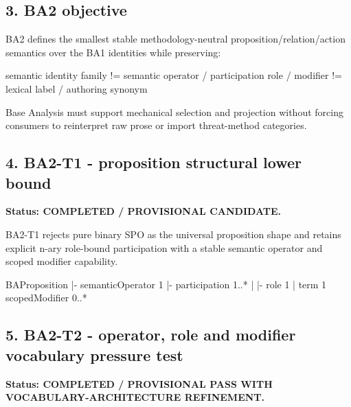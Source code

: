 \documentclass[
  10pt,
  letterpaper,
]{article}
\newenvironment{Shaded}{}{}
\newcommand{\NormalTok}[1]{#1}
\begin{document}
\subsection{3. BA2 objective}\label{ba2-objective}

BA2 defines the smallest stable methodology-neutral
proposition/relation/action semantics over the BA1 identities while
preserving:

\begin{Shaded}
\begin{Highlighting}[]
\NormalTok{semantic identity family}
\NormalTok{    !=}
\NormalTok{semantic operator / participation role / modifier}
\NormalTok{    !=}
\NormalTok{lexical label / authoring synonym}
\end{Highlighting}
\end{Shaded}

Base Analysis must support mechanical selection and projection without
forcing consumers to reinterpret raw prose or import threat-method
categories.

\subsection{4. BA2-T1 - proposition structural lower
bound}\label{ba2-t1---proposition-structural-lower-bound}

\textbf{Status: COMPLETED / PROVISIONAL CANDIDATE.}

BA2-T1 rejects pure binary SPO as the universal proposition shape and
retains explicit n-ary role-bound participation with a stable semantic
operator and scoped modifier capability.

\begin{Shaded}
\begin{Highlighting}[]
\NormalTok{BAProposition}
\NormalTok{|{-} semanticOperator   1}
\NormalTok{|{-} participation      1..*}
\NormalTok{|    |{-} role          1}
\NormalTok{|    \textasciigrave{}{-} term          1}
\NormalTok{\textasciigrave{}{-} scopedModifier     0..*}
\end{Highlighting}
\end{Shaded}

\subsection{5. BA2-T2 - operator, role and modifier vocabulary pressure
test}\label{ba2-t2---operator-role-and-modifier-vocabulary-pressure-test}

\textbf{Status: COMPLETED / PROVISIONAL PASS WITH
VOCABULARY-ARCHITECTURE REFINEMENT.}
\end{document}
